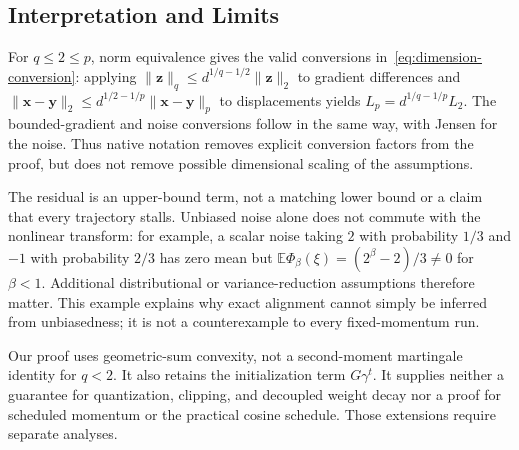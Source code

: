 \documentclass[10pt,a4paper]{amsart}
\begin{document}
\subsection{Interpretation and Limits}
For $q\le2\le p$, norm equivalence gives the valid conversions in~\eqref{eq:dimension-conversion}: applying $\|\mathbf{z}\|_q\le d^{1/q-1/2}\|\mathbf{z}\|_2$ to gradient differences and $\|\mathbf{x}-\mathbf{y}\|_2\le d^{1/2-1/p}\|\mathbf{x}-\mathbf{y}\|_p$ to displacements yields $L_p=d^{1/q-1/p}L_2$. The bounded-gradient and noise conversions follow in the same way, with Jensen for the noise. Thus native notation removes explicit conversion factors from the proof, but does not remove possible dimensional scaling of the assumptions.

The residual is an upper-bound term, not a matching lower bound or a claim that every trajectory stalls. Unbiased noise alone does not commute with the nonlinear transform: for example, a scalar noise taking $2$ with probability $1/3$ and $-1$ with probability $2/3$ has zero mean but $\mathbb E\Phi_\beta(\xi)=(2^\beta-2)/3\ne0$ for $\beta<1$. Additional distributional or variance-reduction assumptions therefore matter. This example explains why exact alignment cannot simply be inferred from unbiasedness; it is not a counterexample to every fixed-momentum run.

Our proof uses geometric-sum convexity, not a second-moment martingale identity for $q<2$. It also retains the initialization term $G\gamma^t$. It supplies neither a guarantee for quantization, clipping, and decoupled weight decay nor a proof for scheduled momentum or the practical cosine schedule. Those extensions require separate analyses.
\end{document}
